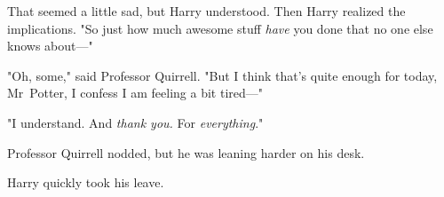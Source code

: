 That seemed a little sad, but Harry understood. Then Harry realized the
implications. "So just how much awesome stuff \emph{have} you done that no one
else knows about---"

"Oh, some," said Professor Quirrell. "But I think that's quite enough for
today, Mr~Potter, I confess I am feeling a bit tired---"

"I understand. And \emph{thank you.} For \emph{everything}."

Professor Quirrell nodded, but he was leaning harder on his desk.

Harry quickly took his leave.

